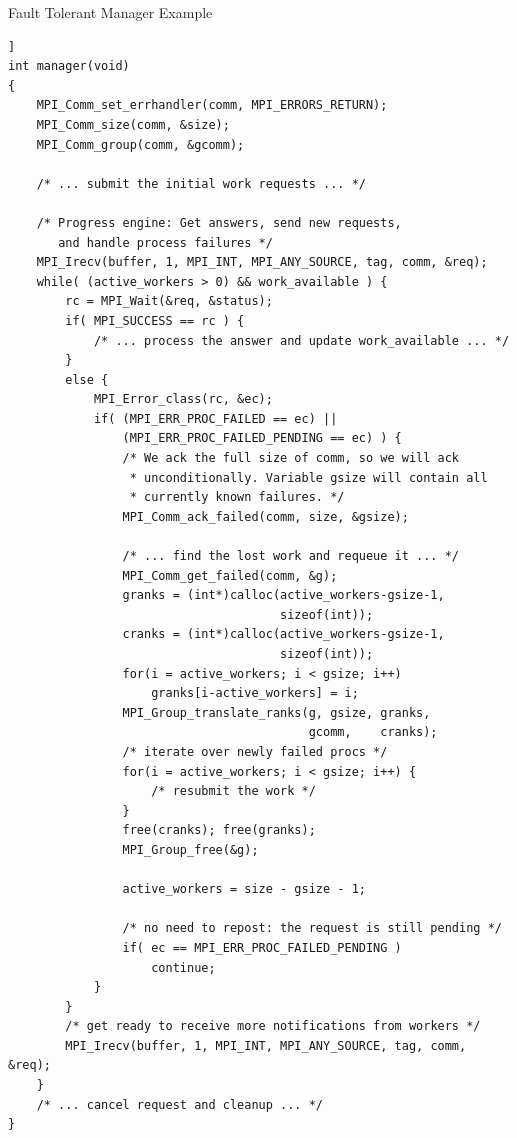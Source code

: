 \begin{example}
\label{ft-ex-manager-worker}
%
Fault Tolerant Manager Example
\begin{lstlisting}[language={[MPI]C}]]
int manager(void)
{
    MPI_Comm_set_errhandler(comm, MPI_ERRORS_RETURN);
    MPI_Comm_size(comm, &size);
    MPI_Comm_group(comm, &gcomm);

    /* ... submit the initial work requests ... */

    /* Progress engine: Get answers, send new requests,
       and handle process failures */
    MPI_Irecv(buffer, 1, MPI_INT, MPI_ANY_SOURCE, tag, comm, &req);
    while( (active_workers > 0) && work_available ) {
        rc = MPI_Wait(&req, &status);
        if( MPI_SUCCESS == rc ) {
            /* ... process the answer and update work_available ... */
        }
        else {
            MPI_Error_class(rc, &ec);
            if( (MPI_ERR_PROC_FAILED == ec) ||
                (MPI_ERR_PROC_FAILED_PENDING == ec) ) {
                /* We ack the full size of comm, so we will ack
                 * unconditionally. Variable gsize will contain all
                 * currently known failures. */
                MPI_Comm_ack_failed(comm, size, &gsize);

                /* ... find the lost work and requeue it ... */
                MPI_Comm_get_failed(comm, &g);
                granks = (int*)calloc(active_workers-gsize-1,
                                      sizeof(int));
                cranks = (int*)calloc(active_workers-gsize-1,
                                      sizeof(int));
                for(i = active_workers; i < gsize; i++)
                    granks[i-active_workers] = i;
                MPI_Group_translate_ranks(g, gsize, granks,
                                          gcomm,    cranks);
                /* iterate over newly failed procs */
                for(i = active_workers; i < gsize; i++) {
                    /* resubmit the work */
                }
                free(cranks); free(granks);
                MPI_Group_free(&g);

                active_workers = size - gsize - 1;

                /* no need to repost: the request is still pending */
                if( ec == MPI_ERR_PROC_FAILED_PENDING )
                    continue;
            }
        }
        /* get ready to receive more notifications from workers */
        MPI_Irecv(buffer, 1, MPI_INT, MPI_ANY_SOURCE, tag, comm, &req);
    }
    /* ... cancel request and cleanup ... */
}
\end{lstlisting}
\end{example}

